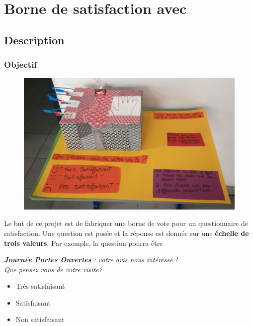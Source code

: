 \section{Borne de satisfaction avec \mb}


%
\pagestyle{mb} %

\subsection{Description}

\subsubsection{Objectif}



\begin{figure}
    \includegraphics[width=\linewidth]{res/jpo.jpg}
\end{figure}
    
\begin{formule}
Le but de ce projet est de fabriquer une borne de vote pour un questionnaire de satisfaction. Une question est posée et la réponse est donnée sur une \textbf{échelle de trois valeurs}. Par exemple, la question pourra être \\[1em]

\begin{minipage}[t]{0.7\linewidth}
        \large\textit{\textbf{Journée Portes Ouvertes} : votre avis nous intéresse !\\Que pensez vous de votre visite?} \\[1em]
        \begin{itemize}
            \item {\LARGE\smiley} Très satisfaisant
            \item Satisfaisant
            \item {\LARGE\frownie} Non satisfaisant
        \end{itemize}        
\end{minipage}
    
\end{formule}


